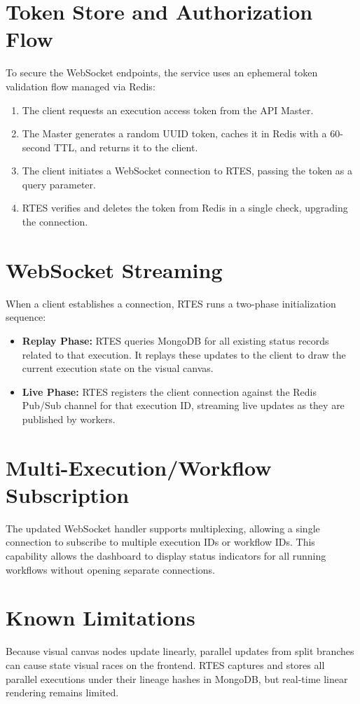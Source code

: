 \documentclass[12pt]{report}
\begin{document}
\section{Token Store and Authorization Flow}
To secure the WebSocket endpoints, the service uses an ephemeral token validation flow managed via Redis:
\begin{enumerate}
    \item The client requests an execution access token from the API Master.
    \item The Master generates a random UUID token, caches it in Redis with a 60-second TTL, and returns it to the client.
    \item The client initiates a WebSocket connection to RTES, passing the token as a query parameter.
    \item RTES verifies and deletes the token from Redis in a single check, upgrading the connection.
\end{enumerate}

\section{WebSocket Streaming}
When a client establishes a connection, RTES runs a two-phase initialization sequence:
\begin{itemize}
    \item \textbf{Replay Phase:} RTES queries MongoDB for all existing status records related to that execution. It replays these updates to the client to draw the current execution state on the visual canvas.
    \item \textbf{Live Phase:} RTES registers the client connection against the Redis Pub/Sub channel for that execution ID, streaming live updates as they are published by workers.
\end{itemize}

\section{Multi-Execution/Workflow Subscription}
The updated WebSocket handler supports multiplexing, allowing a single connection to subscribe to multiple execution IDs or workflow IDs. This capability allows the dashboard to display status indicators for all running workflows without opening separate connections.

\section{Known Limitations}
Because visual canvas nodes update linearly, parallel updates from split branches can cause state visual races on the frontend. RTES captures and stores all parallel executions under their lineage hashes in MongoDB, but real-time linear rendering remains limited.
\end{document}
